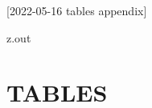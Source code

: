 [2022-05-16 tables appendix]

\begin{VerbatimOut}{z.out}
\chapter{TABLES}
\end{VerbatimOut}

\MyIO


% 
% 
